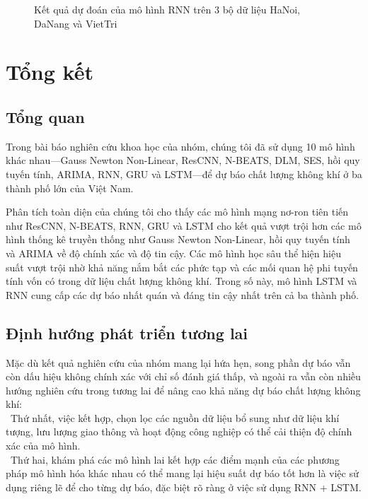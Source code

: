 \documentclass[conference]{IEEEtran}
\begin{document}
\begin{figure}[h]
{    }
    \caption{Kết quả dự đoán của mô hình RNN trên 3 bộ dữ liệu HaNoi, DaNang và VietTri}
\end{figure}

\section{Tổng kết}
\subsection{Tổng quan}
Trong bài báo nghiên cứu khoa học của nhóm, chúng tôi đã sử dụng 10 mô hình khác nhau—Gauss Newton Non-Linear, ResCNN, N-BEATS, DLM, SES, hồi quy tuyến tính, ARIMA, RNN, GRU và LSTM—để dự báo chất lượng không khí ở ba thành phố lớn của Việt Nam.

Phân tích toàn diện của chúng tôi cho thấy các mô hình mạng nơ-ron tiên tiến như ResCNN, N-BEATS, RNN, GRU và LSTM cho kết quả vượt trội hơn các mô hình thống kê truyền thống như Gauss Newton Non-Linear, hồi quy tuyến tính và ARIMA về độ chính xác và độ tin cậy. Các mô hình học sâu thể hiện hiệu suất vượt trội nhờ khả năng nắm bắt các phức tạp và các mối quan hệ phi tuyến tính vốn có trong dữ liệu chất lượng không khí. Trong số này, mô hình LSTM và RNN cung cấp các dự báo nhất quán và đáng tin cậy nhất trên cả ba thành phố.
\subsection{Định hướng phát triển tương lai}
Mặc dù kết quả nghiên cứu của nhóm mang lại hứa hẹn, song phần dự báo vẫn còn dấu hiệu không chính xác với chỉ số đánh giá thấp, và ngoài ra vẫn còn nhiều hướng nghiên cứu trong tương lai để nâng cao khả năng dự báo chất lượng không khí:\\
\indent\textbullet\ Thứ nhất, việc kết hợp, chọn lọc các nguồn dữ liệu bổ sung như dữ liệu khí tượng, lưu lượng giao thông và hoạt động công nghiệp có thể cải thiện độ chính xác của mô hình.\\
\indent\textbullet\ Thứ hai, khám phá các mô hình lai kết hợp các điểm mạnh của các phương pháp mô hình hóa khác nhau có thể mang lại hiệu suất dự báo tốt hơn là việc sử dụng riêng lẽ để cho từng dự báo, đặc biệt rõ ràng ở việc sử dụng RNN + LSTM.
\end{document}
